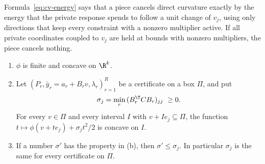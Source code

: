 Formula~\eqref{eq:cv-energy} says that a piece cancels direct curvature exactly
by the energy that the private response spends to follow a unit change of
$v_j$, using only directions that keep every constraint with a nonzero
multiplier active. If all private coordinates coupled to $v_j$ are held at
bounds with nonzero multipliers, the piece cancels nothing.

\begin{proposition}\label{prop:vf-curv}
\begin{enumerate}
\item[(a)] $\phi$ is finite and concave on $\R^k$.
\item[(b)] Let $(P_r,\bar y_r=a_r+B_rv,\lambda_r)_{r=1}^R$ be a certificate on a
box $\Pi$, and put
\[
\sigma_j=\min_r\,(B_r^{\T}CB_r)_{jj}\ \ge0.
\]
For every $v\in\Pi$ and every interval $I$ with $v+Ie_j\subseteq\Pi$, the
function $t\mapsto\phi(v+te_j)+\sigma_jt^2/2$ is concave on $I$.
\item[(c)] If a number $\sigma'$ has the property in (b), then
$\sigma'\le\sigma_j$. In particular $\sigma_j$ is the same for every
certificate on $\Pi$.
\end{enumerate}
\end{proposition}

